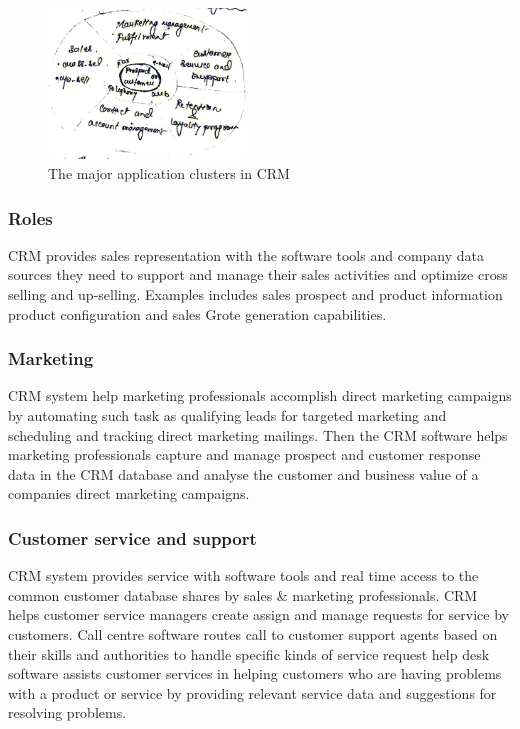 \documentclass[twocolumn, 12pt, a4paper]{article}
\begin{document}
\begin{figure}[h]
  \centering
  \includegraphics[width=0.47\textwidth]{CRMapplicationcluster}
  \caption{The major application clusters in CRM}
\end{figure}%

\subsubsection{Roles}
CRM provides sales representation with the software tools and company data sources they need to support and manage their sales activities and optimize cross selling and up-selling. Examples includes sales prospect and product information product configuration and sales Grote generation  capabilities.

\subsubsection{Marketing}
CRM system help marketing professionals accomplish direct marketing campaigns by automating such task as qualifying leads for targeted marketing and scheduling and tracking direct marketing mailings. Then the CRM software helps marketing professionals capture and manage prospect and customer response data in the CRM database and analyse the customer and business value of a companies direct marketing campaigns.

\subsubsection{Customer service and support}
CRM system provides service with software tools and real time access to the common customer database shares by sales \& marketing professionals. CRM helps customer service managers create assign and manage requests for service by customers. Call centre software routes call to customer support agents based on their skills and authorities to handle specific kinds of service request help desk software assists customer services in helping customers who are having problems with a product or service by providing relevant service data and suggestions for resolving problems.
\end{document}
